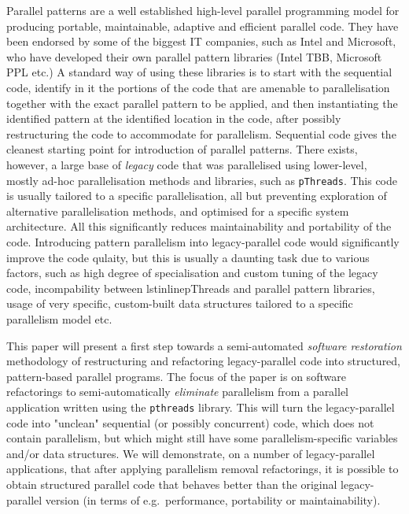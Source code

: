 \documentclass{llncs}
\begin{document}
Parallel patterns are a well established high-level parallel programming model for producing portable, maintainable, adaptive and efficient parallel code. They have been endorsed by some of the biggest IT companies, such as Intel and Microsoft, who have developed their own parallel pattern libraries (Intel TBB, Microsoft PPL etc.) A standard way of using these libraries is to start with the sequential code, identify in it the portions of the code that are amenable to parallelisation together with the exact parallel pattern to be applied, and then instantiating the identified pattern at the identified location in the code, after possibly restructuring the code to accommodate for parallelism. Sequential code gives the cleanest starting point for introduction of parallel patterns. There exists, however, a large base of \emph{legacy} code that was parallelised using lower-level, mostly ad-hoc parallelisation methods and libraries, such as \lstinline{pThreads}. This code is usually tailored to a specific parallelisation, all but preventing exploration of alternative parallelisation methods, and optimised for a specific system architecture. All this significantly reduces maintainability and portability of the code. %
Introducing pattern parallelism into legacy-parallel code would significantly improve the code qulaity, but this is usually a daunting task due to various factors, such as high degree of specialisation and custom tuning of the legacy code, incompability between lstinline{pThreads} and parallel pattern libraries, usage of very specific, custom-built data structures tailored to a specific parallelism model etc.
  
This paper will present a first step towards a semi-automated \emph{software restoration} methodology of restructuring and refactoring legacy-parallel code into structured, pattern-based parallel programs. The focus of the paper is on software refactorings to semi-automatically \emph{eliminate} parallelism from a parallel application written using the \lstinline{pthreads} library. This will turn the legacy-parallel code into "unclean" sequential (or possibly concurrent) code, which does not contain parallelism, but which might still have some parallelism-specific variables and/or data structures. We will demonstrate, on a number of legacy-parallel applications, that after applying parallelism removal refactorings, it is possible to obtain structured parallel code that behaves better than the original legacy-parallel version (in terms of e.g.~performance, portability or maintainability).
\end{document}

